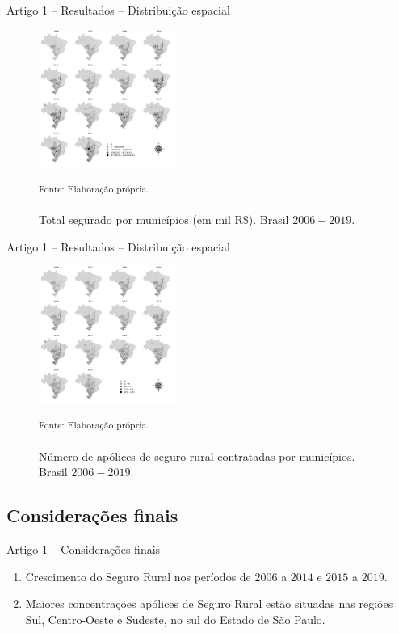 \documentclass[aspectratio=169]{beamer}
\begin{document}
\begin{frame}{Artigo 1 -- Resultados  -- Distribuição espacial}
	\begin{figure}
		\centering
		\includegraphics[width=0.4\textwidth]{img/map_total_segurado_mil.png}
		\caption{Total segurado por municípios (em mil R\$). Brasil $2006 - 2019$.}
		\small \textsuperscript {Fonte: Elaboração própria.}
	\end{figure}
\end{frame}

\begin{frame}{Artigo 1 -- Resultados  -- Distribuição espacial}
	\begin{figure}
		\centering
		\includegraphics[width=0.4\textwidth]{img/map_apolices_contratadas.png}
		\caption{Número de apólices de seguro rural contratadas por municípios. Brasil $2006 - 2019$.}
		\small \textsuperscript {Fonte: Elaboração própria.}
	\end{figure}
\end{frame}

\subsection{Considerações finais}

\begin{frame}{Artigo 1 -- Considerações finais}
	\begin{enumerate}
	    \item Crescimento do Seguro Rural nos períodos de $2006$ a $2014$ e $2015$ a $2019$.
    	\vspace{0.25cm}
		\item Maiores concentrações apólices de Seguro Rural estão situadas nas regiões  Sul, Centro-Oeste e Sudeste, no sul do Estado de São Paulo.
	\end{enumerate}
\end{frame}
\end{document}
